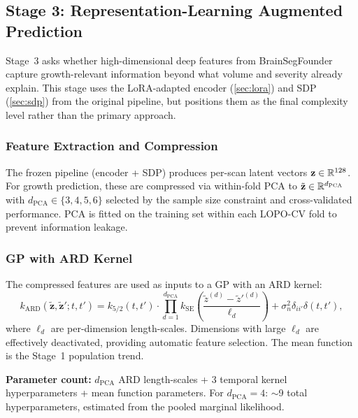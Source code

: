 \subsection{Stage 3: Representation-Learning Augmented Prediction}
\label{sec:growth:stage3}

Stage~3 asks whether high-dimensional deep features from BrainSegFounder
capture growth-relevant information beyond what volume and severity already
explain. This stage uses the LoRA-adapted encoder (\cref{sec:lora}) and
SDP (\cref{sec:sdp}) from the original pipeline, but positions them as the
final complexity level rather than the primary approach.

\subsubsection{Feature Extraction and Compression}

The frozen pipeline (encoder + SDP) produces per-scan latent vectors
$\mathbf{z} \in \mathbb{R}^{128}$. For growth prediction, these are compressed via
within-fold PCA to $\tilde{\mathbf{z}} \in \mathbb{R}^{d_{\text{PCA}}}$ with
$d_{\text{PCA}} \in \{3, 4, 5, 6\}$ selected by the sample size constraint
and cross-validated performance. PCA is fitted on the training set within
each LOPO-CV fold to prevent information leakage.

\subsubsection{GP with ARD Kernel}

The compressed features are used as inputs to a GP with an ARD kernel:
\begin{equation}
  k_{\text{ARD}}(\tilde{\mathbf{z}}, \tilde{\mathbf{z}}'; t, t') =
    k_{5/2}(t, t') \cdot \prod_{d=1}^{d_{\text{PCA}}}
    k_{\text{SE}}\!\left(\frac{\tilde{z}^{(d)} - \tilde{z}'^{(d)}}{\ell_d}\right)
    + \sigma_n^2 \delta_{ii'} \delta(t, t'),
  \label{eq:ard_kernel}
\end{equation}
where $\ell_d$ are per-dimension length-scales. Dimensions with large
$\ell_d$ are effectively deactivated, providing automatic feature selection.
The mean function is the Stage~1 population trend.

\textbf{Parameter count:} $d_{\text{PCA}}$ ARD length-scales + 3 temporal
kernel hyperparameters + mean function parameters. For $d_{\text{PCA}} = 4$:
$\sim$9 total hyperparameters, estimated from the pooled marginal likelihood.

